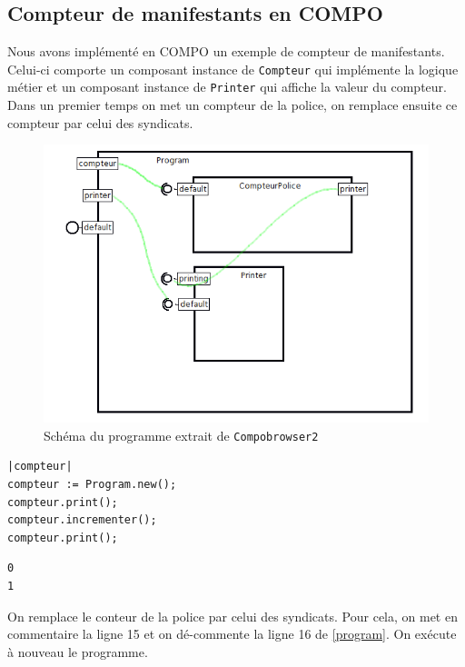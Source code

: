 \documentclass[11pt,a4paper,openany,oneside]{book}
\begin{document}
\begin{appendices}
\chapter{Compteur de manifestants en COMPO}

Nous avons implémenté en COMPO un exemple de compteur de manifestants. Celui-ci comporte un composant instance de \texttt{Compteur} qui implémente la logique métier et un composant instance de \texttt{Printer} qui affiche la valeur du compteur. Dans un premier temps on met un compteur de la police, on remplace ensuite ce compteur par celui des syndicats.

\begin{figure}[H]
\centering
\includegraphics[scale=0.7, keepaspectratio=true]{program}
\caption{Schéma du programme extrait de \texttt{Compobrowser2}}
\label{compteurmanifestant}
\end{figure}

\newpage

\begin{lstlisting}[language=Compo, frame=single, caption=worspace]
|compteur|
compteur := Program.new();
compteur.print();
compteur.incrementer();
compteur.print();
\end{lstlisting}

\begin{lstlisting}[language=Compo, frame=single, caption=output (Avec le \texttt{CompteurPolice})]
0
1
\end{lstlisting}

On remplace le conteur de la police par celui des syndicats. Pour cela, on met en commentaire la ligne 15 et on dé-commente la ligne 16 de \ref{program}. On exécute à nouveau le programme.


\end{appendices}
\end{document}
